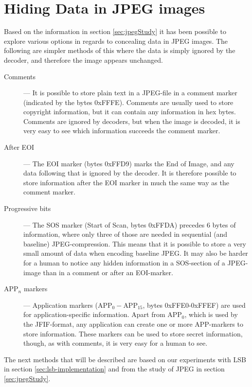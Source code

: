 
\section{Hiding Data in JPEG images}

Based on the information in section \ref{sec:jpegStudy} it has been possible to explore various options in regards to concealing data in JPEG images. The following are simpler methods of this where the data is simply ignored by the decoder, and therefore the image appears unchanged.

\begin{description}
	\item[Comments] ---
	It is possible to store plain text in a JPEG-file in a comment marker (indicated by the bytes 0xFFFE).
	Comments are usually used to store copyright information, but it can contain any information in hex bytes.
	Comments are ignored by decoders, but when the image is decoded, it is very easy to see which information succeeds the comment marker.

	\item[After EOI] ---
	The EOI marker (bytes 0xFFD9) marks the End of Image, and any data following that is ignored by the decoder.
	It is therefore possible to store information after the EOI marker in much the same way as the comment marker.

	\item[Progressive bits]	---
	The SOS marker (Start of Scan, bytes 0xFFDA) precedes 6 bytes of information, where only three of those are needed in sequential (and baseline) JPEG-compression.
	This means that it is possible to store a very small amount of data when encoding baseline JPEG.
	It may also be harder for a human to notice any hidden information in a SOS-section of a JPEG-image than in a comment or after an EOI-marker.

	\item[APP$_n$ markers] ---
	Application markers (APP$_0-$APP$_{15}$, bytes 0xFFE0-0xFFEF) are used for application-specific information.
	Apart from APP$_0$, which is used by the JFIF-format, any application can create one or more APP-markers to store information.
	These markers can be used to store secret information, though, as with comments, it is very easy for a human to see.
\end{description}

\noindent The next methods that will be described are based on our experiments with LSB in section \ref{sec:lsb-implementation} and from the study of JPEG in section \ref{sec:jpegStudy}.

